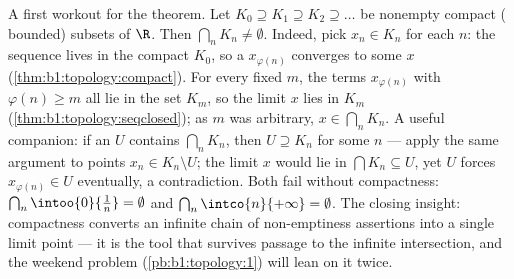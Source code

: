 \begin{example}\label{ex:b1:topology:nested}
A first workout for the theorem. Let $K_0 \supseteq K_1 \supseteq
K_2 \supseteq \dots$ be nonempty compact ( bounded) subsets
of $\R$. Then $\bigcap_n K_n \neq \emptyset$. Indeed, pick $x_n
\in K_n$ for each $n$: the sequence lives in the compact $K_0$,
so a  $x_{\varphi(n)}$ converges to some $x$
(\cref{thm:b1:topology:compact}). For every fixed $m$, the terms
$x_{\varphi(n)}$ with $\varphi(n) \geq m$ all lie in the 
set $K_m$, so the limit $x$ lies in $K_m$
(\cref{thm:b1:topology:seqclosed}); as $m$ was arbitrary, $x \in
\bigcap_n K_n$. A useful companion: if an  $U$ contains
$\bigcap_n K_n$, then $U \supseteq K_n$ for some $n$ --- apply
the same argument to points $x_n \in K_n \setminus U$; the limit
$x$ would lie in $\bigcap K_n \subseteq U$, yet $U$  forces
$x_{\varphi(n)} \in U$ eventually, a contradiction. Both
 fail without compactness: $\bigcap_n \intoo{0}{\frac
1n} = \emptyset$ and $\bigcap_n \intco{n}{+\infty} = \emptyset$.
The closing insight: compactness converts an infinite chain of
non-emptiness assertions into a single limit point --- it is the
tool that survives passage to the infinite intersection, and the
weekend problem (\cref{pb:b1:topology:1}) will lean on it twice.
\end{example}

